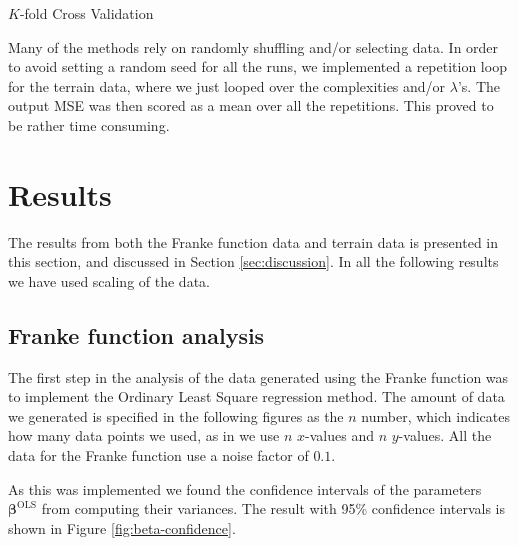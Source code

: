 \documentclass[norsk,a4paper,12pt]{article}
\begin{document}
\begin{multicols}{2}
\begin{algorithm}[H]
\SetAlgoLined
{}
 \caption{$K$-fold Cross Validation}
\end{algorithm}


Many of the methods rely on randomly shuffling and/or selecting data. In order to avoid setting a random seed for all the runs, we implemented a repetition loop for the terrain data, where we just looped over the complexities and/or $\lambda$'s. The output MSE was then scored as a mean over all the repetitions. This proved to be rather time consuming.


\section{Results}\label{sec:results}
The results from both the Franke function data and terrain data is presented in this section, and discussed in Section \ref{sec:discussion}. In all the following results we have used scaling of the data. 

\subsection{Franke function analysis}

The first step in the analysis of the data generated using the Franke function was to implement the Ordinary Least Square regression method. The amount of data we generated is specified in the following figures as the $n$ number, which indicates how many data points we used, as in we use $n$ $x$-values and $n$ $y$-values. All the data for the Franke function use a noise factor of $0.1$.

As this was implemented we found the confidence intervals of the parameters $\boldsymbol{\beta}^{\mathrm{OLS}}$ from computing their variances. The result with 95\% confidence intervals is shown in Figure \ref{fig:beta-confidence}. 


\end{multicols}
\end{document}
